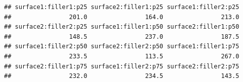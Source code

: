 \documentclass[
]{article}
\newenvironment{Shaded}{\begin{snugshade}}{\end{snugshade}}
\newcommand{\AttributeTok}[1]{\textcolor[rgb]{0.13,0.29,0.53}{#1}}
\newcommand{\DecValTok}[1]{\textcolor[rgb]{0.00,0.00,0.81}{#1}}
\newcommand{\FunctionTok}[1]{\textcolor[rgb]{0.13,0.29,0.53}{\textbf{#1}}}
\newcommand{\NormalTok}[1]{#1}
\newcommand{\OtherTok}[1]{\textcolor[rgb]{0.56,0.35,0.01}{#1}}
\newcommand{\SpecialCharTok}[1]{\textcolor[rgb]{0.81,0.36,0.00}{\textbf{#1}}}
\begin{document}
\begin{Shaded}
\end{Shaded}

\begin{verbatim}
## surface1:filler1:p25 surface2:filler1:p25 surface1:filler2:p25 
##                201.0                164.0                213.0 
## surface2:filler2:p25 surface1:filler1:p50 surface2:filler1:p50 
##                148.5                237.0                187.5 
## surface1:filler2:p50 surface2:filler2:p50 surface1:filler1:p75 
##                233.5                113.5                267.0 
## surface2:filler1:p75 surface1:filler2:p75 surface2:filler2:p75 
##                232.0                234.5                143.5
\end{verbatim}
\end{document}
